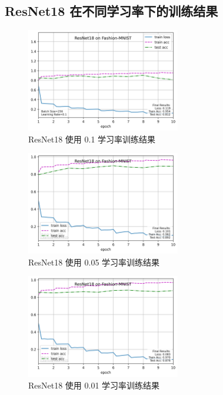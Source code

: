 \documentclass[UTF8]{ctexart}
\begin{document}
\newpage
\subsection{ResNet18 在不同学习率下的训练结果}
\begin{center}
\begin{minipage}{\textwidth}
\begin{figure}[H]
    \centering
    \includegraphics[width=0.6\textwidth]{picture/resnet18_on_fashion-mnist_bs256_lr0.1_20241110_221226.png}
    \caption{ResNet18 使用 0.1 学习率训练结果}
\end{figure}
\vfill

\begin{figure}[H]
    \centering
    \includegraphics[width=0.6\textwidth]{picture/resnet18_on_fashion-mnist_bs256_lr0.05_20241110_221842.png}
    \caption{ResNet18 使用 0.05 学习率训练结果}
\end{figure}
\vfill

\begin{figure}[H]
    \centering
    \includegraphics[width=0.6\textwidth]{picture/resnet18_on_fashion-mnist_bs256_lr0.01_20241110_222516.png}
    \caption{ResNet18 使用 0.01 学习率训练结果}
\end{figure}
\end{minipage}
\end{center}
\end{document}
